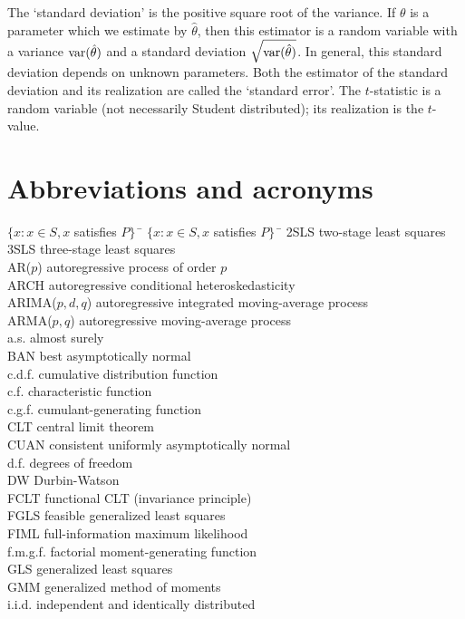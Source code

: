 \documentclass[11pt,dvips,a4paper]{article}
\newcommand{\hspacesymbols}%
   {$\{x: x \in S, x$ satisfies $P\}\;\;$} %
\begin{document}
The `standard deviation' is the positive square root of the variance.
If $\theta$ is a parameter which we estimate by $\hat{\theta}$,
then this estimator is a random variable with a variance
$\operatorname{var}(\hat{\theta})$
and a standard deviation
$\sqrt{\operatorname{var}(\hat{\theta})}$.
In general, this standard deviation depends on unknown parameters.
Both the estimator of the standard deviation
and its realization are called the `standard error'.
The $t$-statistic is a random variable (not necessarily Student
distributed); its realization is the $t$-value.
%
\section{Abbreviations and acronyms}
\begin{tabbing}
\hspacesymbols \= \hspacesymbols\qquad\quad \=  \kill
2SLS \> two-stage least squares \\
3SLS \> three-stage least squares \\
AR($p$) \> autoregressive process of order $p$ \\
ARCH \> autoregressive conditional heteroskedasticity \\
ARIMA($p,d,q$)\> autoregressive integrated moving-average process \\
ARMA($p,q$) \> autoregressive moving-average process \\
a.s. \> almost surely   \\
BAN \> best asymptotically normal \\
c.d.f. \> cumulative distribution function \\
c.f. \> characteristic function \\
c.g.f. \> cumulant-generating function \\
CLT \> central limit theorem \\
CUAN \> consistent uniformly asymptotically normal \\
d.f. \> degrees of freedom \\
DW \> Durbin-Watson \\
FCLT \> functional CLT (invariance principle) \\
FGLS \> feasible generalized least squares \\
FIML \> full-information maximum likelihood \\
f.m.g.f. \> factorial moment-generating function \\
GLS \> generalized least squares \\
GMM \> generalized method of moments \\
i.i.d. \> independent and identically distributed \\

\end{tabbing}
\end{document}

